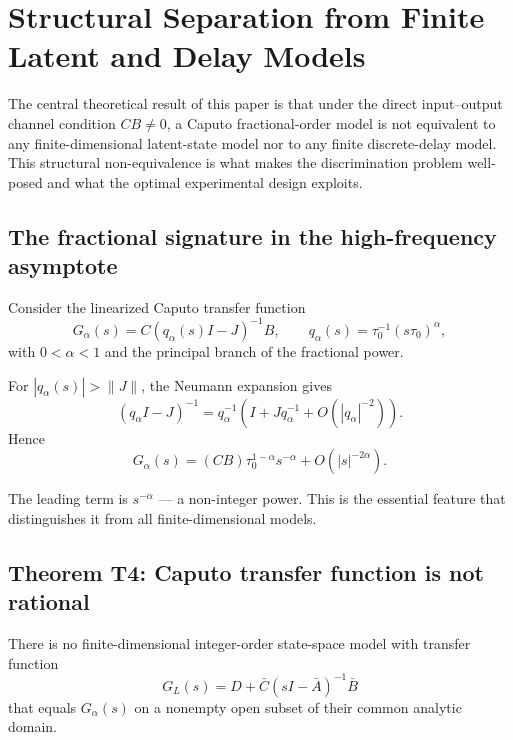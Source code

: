 \section{Structural Separation from Finite Latent and Delay Models}
\label{sec:separation}

The central theoretical result of this paper is that under the direct input--output channel condition \(CB \neq 0\), a Caputo fractional-order model is not equivalent to any finite-dimensional latent-state model nor to any finite discrete-delay model. This structural non-equivalence is what makes the discrimination problem well-posed and what the optimal experimental design exploits.

\subsection{The fractional signature in the high-frequency asymptote}

Consider the linearized Caputo transfer function
\begin{equation}
G_\alpha(s) = C (q_\alpha(s) I - J)^{-1} B,
\qquad q_\alpha(s) = \tau_0^{-1} (s \tau_0)^\alpha,
\label{eq:galpha}
\end{equation}
with \(0 < \alpha < 1\) and the principal branch of the fractional power.

For \(|q_\alpha(s)| > \|J\|\), the Neumann expansion gives
\begin{equation}
(q_\alpha I - J)^{-1} = q_\alpha^{-1}(I + J q_\alpha^{-1} + O(|q_\alpha|^{-2})).
\end{equation}
Hence
\begin{equation}
G_\alpha(s) = (CB) \tau_0^{1-\alpha} s^{-\alpha} + O(|s|^{-2\alpha}).
\label{eq:frac_asymp}
\end{equation}

The leading term is \(s^{-\alpha}\) --- a non-integer power. This is the essential feature that distinguishes it from all finite-dimensional models.

\subsection{Theorem T4: Caputo transfer function is not rational}

\begin{theorem}
\label{thm:T4}
There is no finite-dimensional integer-order state-space model with transfer function
\[
G_L(s) = D + \bar{C}(sI - \bar{A})^{-1}\bar{B}
\]
that equals \(G_\alpha(s)\) on a nonempty open subset of their common analytic domain.
\end{theorem}

